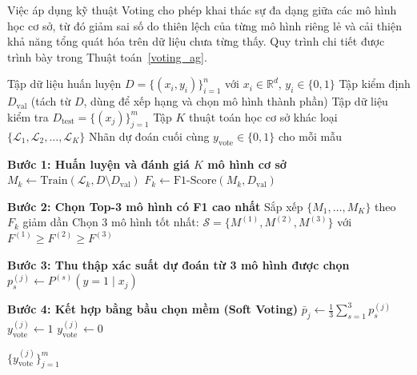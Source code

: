 Việc áp dụng kỹ thuật Voting cho phép khai thác sự đa dạng giữa các mô hình học cơ sở, từ đó giảm sai số do thiên lệch của từng mô hình riêng lẻ và cải thiện khả năng tổng quát hóa trên dữ liệu chưa từng thấy. Quy trình chi tiết được trình bày trong Thuật toán~\ref{voting_ag}.

\begin{algorithm}[htbp]
\caption{Soft Voting Ensemble}
\label{voting_ag}
\begin{algorithmic}[1]
\Require Tập dữ liệu huấn luyện $D = \{(x_i, y_i)\}_{i=1}^{n}$ với $x_i \in \mathbb{R}^d$, $y_i \in \{0, 1\}$
\Statex \qquad Tập kiểm định $D_{\text{val}}$ (tách từ $D$, dùng để xếp hạng và chọn mô hình thành phần)
\Statex \qquad Tập dữ liệu kiểm tra $D_{\text{test}} = \{(x_j)\}_{j=1}^{m}$
\Statex \qquad Tập $K$ thuật toán học cơ sở khác loại $\{\mathcal{L}_1, \mathcal{L}_2, \dots, \mathcal{L}_K\}$
\Ensure Nhãn dự đoán cuối cùng $y_{\text{vote}} \in \{0, 1\}$ cho mỗi mẫu

\State \textbf{Bước 1: Huấn luyện và đánh giá $K$ mô hình cơ sở}
    \State $M_k \gets \text{Train}(\mathcal{L}_k, D \setminus D_{\text{val}})$ 
    \State $F_k \gets \text{F1-Score}(M_k, D_{\text{val}})$ 
\EndFor

\State \textbf{Bước 2: Chọn Top-3 mô hình có F1 cao nhất}
\State Sắp xếp $\{M_1, \dots, M_K\}$ theo $F_k$ giảm dần
\State Chọn 3 mô hình tốt nhất: $\mathcal{S} = \{M^{(1)}, M^{(2)}, M^{(3)}\}$ với $F^{(1)} \geq F^{(2)} \geq F^{(3)}$

\State \textbf{Bước 3: Thu thập xác suất dự đoán từ 3 mô hình được chọn}
        \State $p_s^{(j)} \gets P^{(s)}(y=1 \mid x_j)$ 
    \EndFor
\EndFor

\State \textbf{Bước 4: Kết hợp bằng bầu chọn mềm (Soft Voting)}
    \State $\bar{p}_j \gets \frac{1}{3} \displaystyle\sum_{s=1}^{3} p_s^{(j)}$ 
        \State $y_{\text{vote}}^{(j)} \gets 1$ 
    \Else
        \State $y_{\text{vote}}^{(j)} \gets 0$ 
    \EndIf
\EndFor

\State \Return $\{y_{\text{vote}}^{(j)}\}_{j=1}^{m}$
\end{algorithmic}
\end{algorithm}

